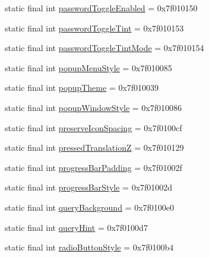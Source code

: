 \begin{CompactItemize}
\item 
static final int \hyperlink{classandroid_1_1support_1_1v7_1_1recyclerview_1_1_r_1_1attr_939172509db5b3930e65a35d0356c989}{passwordToggleEnabled} = 0x7f010150
\item 
static final int \hyperlink{classandroid_1_1support_1_1v7_1_1recyclerview_1_1_r_1_1attr_4965390df125119151048efdf19c25ed}{passwordToggleTint} = 0x7f010153
\item 
static final int \hyperlink{classandroid_1_1support_1_1v7_1_1recyclerview_1_1_r_1_1attr_da5187e8e09ef20343c6616fa4b2eb02}{passwordToggleTintMode} = 0x7f010154
\item 
static final int \hyperlink{classandroid_1_1support_1_1v7_1_1recyclerview_1_1_r_1_1attr_4a1e3ea2b240f601ebb8a616d0ee3572}{popupMenuStyle} = 0x7f010085
\item 
static final int \hyperlink{classandroid_1_1support_1_1v7_1_1recyclerview_1_1_r_1_1attr_842acf24775732a7c5df90a50a1c5d17}{popupTheme} = 0x7f010039
\item 
static final int \hyperlink{classandroid_1_1support_1_1v7_1_1recyclerview_1_1_r_1_1attr_0c85f8264b72b0b84a02b3b1eaebc36c}{popupWindowStyle} = 0x7f010086
\item 
static final int \hyperlink{classandroid_1_1support_1_1v7_1_1recyclerview_1_1_r_1_1attr_5764799916b0cc69765e883320c04dcd}{preserveIconSpacing} = 0x7f0100cf
\item 
static final int \hyperlink{classandroid_1_1support_1_1v7_1_1recyclerview_1_1_r_1_1attr_0921252cb47f1868b80177d382837d6b}{pressedTranslationZ} = 0x7f010129
\item 
static final int \hyperlink{classandroid_1_1support_1_1v7_1_1recyclerview_1_1_r_1_1attr_201ce9f69baacb0bae3cc85b515d9030}{progressBarPadding} = 0x7f01002f
\item 
static final int \hyperlink{classandroid_1_1support_1_1v7_1_1recyclerview_1_1_r_1_1attr_d600f2f0a259e1c72ba1d4e9cbf3bd9f}{progressBarStyle} = 0x7f01002d
\item 
static final int \hyperlink{classandroid_1_1support_1_1v7_1_1recyclerview_1_1_r_1_1attr_2b81323e0855856982097b3c13b3d788}{queryBackground} = 0x7f0100e0
\item 
static final int \hyperlink{classandroid_1_1support_1_1v7_1_1recyclerview_1_1_r_1_1attr_ed84fca4814f2d037f093e9ff23fd58a}{queryHint} = 0x7f0100d7
\item 
static final int \hyperlink{classandroid_1_1support_1_1v7_1_1recyclerview_1_1_r_1_1attr_0454e98e0727f2ed1cbf0b6982b219e7}{radioButtonStyle} = 0x7f0100b4

\end{CompactItemize}

